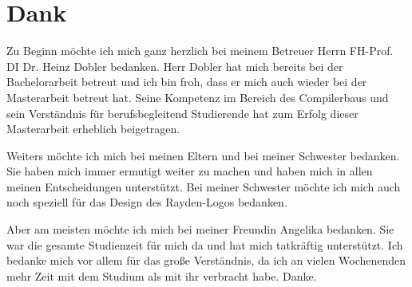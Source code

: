 \chapter{Dank}

Zu Beginn möchte ich mich ganz herzlich bei meinem Betreuer Herrn FH-Prof. DI Dr. Heinz Dobler bedanken. Herr Dobler hat mich bereits bei der Bachelorarbeit betreut und ich bin froh, dass er mich auch wieder bei der Masterarbeit betreut hat. Seine Kompetenz im Bereich des Compilerbaus und sein Verständnis für berufsbegleitend Studierende hat zum Erfolg dieser Masterarbeit erheblich beigetragen. 

\SuperPar
Weiters möchte ich mich bei meinen Eltern und bei meiner Schwester bedanken. Sie haben mich immer ermutigt weiter zu machen und haben mich in allen meinen Entscheidungen unterstützt. Bei meiner Schwester möchte ich mich auch noch speziell für das Design des Rayden-Logos bedanken.

\SuperPar
Aber am meisten möchte ich mich bei meiner Freundin Angelika bedanken. Sie war die gesamte Studienzeit für mich da und hat mich tatkräftig unterstützt. Ich bedanke mich vor allem für das große Verständnis, da ich an vielen Wochenenden mehr Zeit mit dem Studium als mit ihr verbracht habe. Danke.
